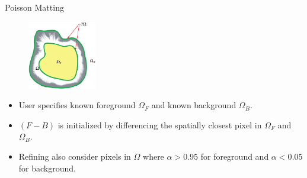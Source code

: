 \documentclass{beamer}
\begin{document}
\begin{frame}[allowframebreaks]{Poisson Matting \cite{sun2004poisson}}
\begin{enumerate}
 \end{enumerate}
 \begin{figure}
  \includegraphics[width=3cm]{images/poissonRegion.png}
 \end{figure}
 \begin{itemize}
  \item User specifies known foreground $\Omega_F$ and known background
        $\Omega_B$.
  \item $(F-B)$ is initialized by differencing the spatially closest pixel
        in $\Omega_F$ and $\Omega_B$.
  \item Refining also consider pixels in $\Omega$ where $\alpha > 0.95$ for
        foreground and $\alpha < 0.05$ for background.
 \end{itemize}
\end{frame}
\end{document}
